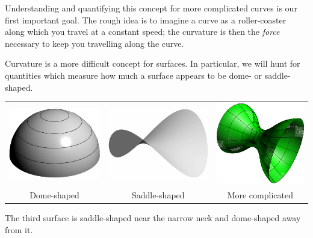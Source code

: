 Understanding and quantifying this concept for more complicated curves is our first important goal. The rough idea is to imagine a curve as a roller-coaster along which you travel at a constant speed; the curvature is then the \emph{force} necessary to keep you travelling along the curve.\smallbreak

Curvature is a more difficult concept for surfaces. In particular, we will hunt for quantities which measure how much a surface appears to be dome- or saddle-shaped.
\begin{center}
\begin{tabular}{c@{\qquad\qquad}c@{\qquad\qquad}c}
\includegraphics[scale=0.9]{intro-dome}&\includegraphics{intro-saddle}&\includegraphics{intro-saddle-dome}\\[5pt]
Dome-shaped&Saddle-shaped&More complicated
\end{tabular}
\end{center}
The third surface is saddle-shaped near the narrow neck and dome-shaped away from it.


